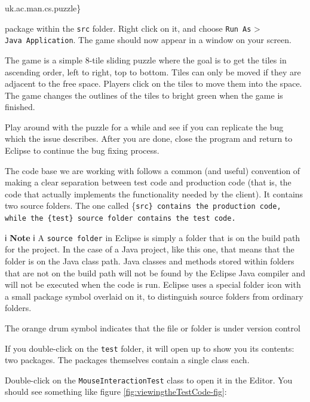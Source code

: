 \documentclass[
]{book}
\newenvironment{Shaded}{\begin{snugshade}}{\end{snugshade}}
\newcommand{\NormalTok}[1]{#1}
\begin{document}
\begin{Shaded}
\begin{Highlighting}[]
\NormalTok{uk.ac.man.cs.puzzle\}}
\end{Highlighting}
\end{Shaded}

package within the \texttt{src} folder. Right click on it, and choose \texttt{Run\ As} \textgreater{} \texttt{Java\ Application}. The game should now appear in a window on your screen.

The game is a simple 8-tile sliding puzzle where the goal is to get the tiles in ascending order, left to right, top to bottom. Tiles can only be moved if they are adjacent to the free space. Players click on the tiles to move them into the space. The game changes the outlines of the tiles to bright green when the game is finished.

Play around with the puzzle for a while and see if you can replicate the bug which the issue describes. After you are done, close the program and return to Eclipse to continue the bug fixing process.

The code base we are working with follows a common (and useful) convention of making a clear separation between test code and production code (that is, the code that actually implements the functionality needed by the client). It contains two source folders. The one called \{\tt src\} contains the production code, while the \{\tt test\} source folder contains the test code.

ℹ️ \textbf{Note} ℹ️
A \texttt{source\ folder} in Eclipse is simply a folder that is on the build path for the project. In the case of a Java project, like this one, that means that the folder is on the Java class path. Java classes and methods stored within folders that are not on the build path will not be found by the Eclipse Java compiler and will not be executed when the code is run. Eclipse uses a special folder icon with a small package symbol overlaid on it, to distinguish source folders from ordinary folders.

The orange drum symbol indicates that the file or folder is under version control

If you double-click on the \texttt{test} folder, it will open up to show you its contents: two packages. The packages themselves contain a single class each.

Double-click on the \texttt{MouseInteractionTest} class to open it in the Editor. You should see something like figure \ref{fig:viewingtheTestCode-fig}:
\end{document}

